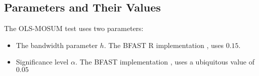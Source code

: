 \documentclass[main.tex]{subfiles}
\begin{document}
\subsection{Parameters and Their Values}
\label{subsec:mosum_parameters}
The OLS-MOSUM test uses two parameters:
\begin{itemize}
\item The bandwidth parameter $h$. The BFAST R implementation
  \cite{bfast-github}, uses $0.15$.
\item Significance level $\alpha$. The BFAST implementation
  \cite{bfast-github}, uses a ubiquitous value of $0.05$
\end{itemize}


\biblio
\end{document}

